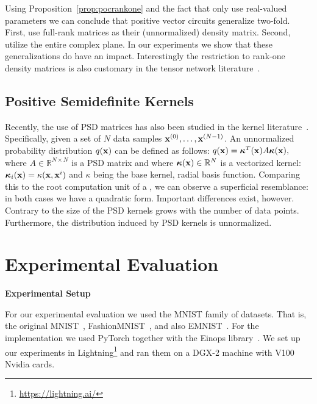 Using Proposition~\ref{prop:pocrankone} and the fact that \snpcs only use real-valued parameters we can conclude that positive vector circuits generalize \snpcs two-fold. First, \pvcs use full-rank matrices as their (unnormalized) density matrix. Second, \pvcs utilize the entire complex plane. In our experiments we show that these generalizations do have an impact.
Interestingly the restriction to rank-one density matrices is also customary in the tensor network literature~\citep{cheng2019tree,han2018unsupervised}.



\subsection*{Positive Semidefinite Kernels}


Recently, the use of PSD matrices has also been studied in the kernel literature~\citep{marteau2020non,rudi2021psd}. Specifically, given a set of $N$ data samples $\mathbf{x}^{(0)}, \dots, \mathbf{x}^{(N-1)}$. An unnormalized probability distribution $q(\mathbf{x})$ can be defined as follows:
$
	q(\mathbf{x}) = \boldsymbol{\kappa}^{T}(\mathbf{x})  A \boldsymbol{\kappa}(\mathbf{x}),
	\label{eq:psdk}
$
where $A  \in \mathbb{R}^{N \times N}$ is a PSD matrix and where
$\boldsymbol{\kappa}(\mathbf{x}) \in  \mathbb{R}^{N}$ is a vectorized kernel: $\boldsymbol{\kappa}_i(\mathbf{x})= \kappa(\mathbf{x}, \mathbf{x}^{i} )$ and $\kappa$ being the base kernel, \eg radial basis function.
Comparing this to the root computation unit of a \pvc, we can  observe a superficial resemblance: in both cases we have a quadratic form. Important differences exist, however. Contrary to \pvcs the size of the PSD kernels grows with the number of data points. Furthermore, the distribution induced by PSD kernels is unnormalized.




\section{Experimental Evaluation}
\label{sec:experiments}


\textbf{Experimental Setup}


For our experimental evaluation we used the MNIST family of datasets. That is, the original MNIST~\citep{deng2012mnist}, FashionMNIST~\citep{xiao2017fashion}, and also EMNIST~\citep{cohen2017emnist}.
For the implementation we used PyTorch together with the Einops library~\citep{rogozhnikov2022einops}. We set up our experiments in Lightning\footnote{\url{https://lightning.ai/}} and ran them on a DGX-2 machine with V100 Nvidia cards.

